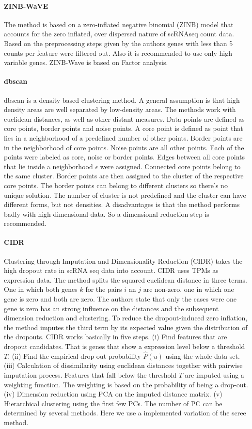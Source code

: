 \documentclass[11pt, a4paper]{article}\usepackage[]{graphicx}\usepackage[]{color}
\begin{document}
\paragraph{ZINB-WaVE}
The method is based on a zero-inflated negative binomial (ZINB) model that accounts for the zero inflated, over dispersed nature of scRNAseq count data\citep{risso2017zinb}. 
Based on the preprocessing steps given by the authors genes with less than 5 counts per feature were filtered out. Also it is recommended to use only high variable genes. ZINB-Wave is based on Factor analysis.

\paragraph{dbscan}
dbscan is a density based clustering method. A general assumption is that high density areas are well separated by low-density areas.  The methods work with euclidean distances, as well as other distant measures. Data points are defined as core points, border points and noise points. A core point is defined as point that lies in a neighborhood of a predefined number of other points. Border points are in the neighborhood of core points. Noise points are all other points. 
Each of the points were labeled as core, noise or border points. Edges between all core points that lie inside a neighborhood $\epsilon$ were assigned. Connected core points belong to the same cluster. Border points are then assigned to the cluster of the respective core points. The border points can belong to different clusters so there's no unique solution. The number of cluster is not predefined and the cluster can have different forms, but not densities. A disadvantages is that the method performs badly with high dimensional data. So a dimensional reduction step is recommended.
\paragraph{CIDR}
Clustering through Imputation and Dimensionality Reduction (CIDR) takes the high dropout rate in scRNA seq data into account. CIDR uses TPMs as expression data. The method splits the squared euclidean distance in three terms. One in which both genes $k$ for the pairs $i$ an $j$ are non-zero, one in which one gene is zero and both are zero. The authors state that only the cases were one gene is zero has an strong influence on the distances and the subsequent  dimension reduction and clustering. To reduce the dropout-induced zero inflation, the method imputes the third term by its expected value given the distribution of the dropouts. CIDR works basically in five steps. (i) Find features that are dropout candidates. That is genes that show a expression level below a threshold $T$. (ii) Find the empirical drop-out probability $\hat P(u)$ using the whole data set. (iii) Calculation of dissimilarity using euclidean distances together with pairwise imputation process. Features that fall below the threshold $T$ are imputed using a weighting function. The weighting is based on the probability of being a drop-out. (iv) Dimension reduction using PCA on the imputed distance matrix. (v) Hierarchical clustering using the first few PCs. The number of PC can be determined by several methods. Here we use a implemented variation of the scree method. 
\end{document}
